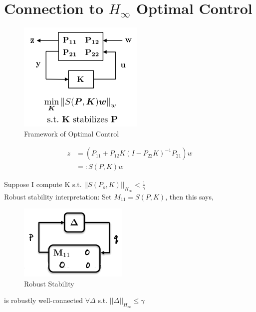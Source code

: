 \documentclass{article}[12pt]
\newcommand{\norm}[1]{\left|\left|#1\right|\right|}
\begin{document}
\section{Connection to $H_{\infty}$ Optimal Control}
\begin{figure} [H]
    \centering
    \includegraphics[scale =.7]{figures/optcontrol.png}
    \caption{Framework of Optimal Control}
    \label{fig:optcontrol}
\end{figure}
\begin{align*}
    z &= (P_{11} + P_{12}K( I - P_{22}K)^{-1}P_{21})w\\
    &=: S(P,K)w
\end{align*}

Suppose I compute K s.t. $\norm{S(P_o, K)}_{H_{\infty}} < \frac{1}{\gamma}$\\
Robust stability interpretation: Set $M_{11} = S(P, K)$, then this says,
\begin{figure}[H]
    \centering
    \includegraphics[scale =.7]{figures/robuststability.png}
    \caption{Robust Stability}
    \label{fig:robuststability}
\end{figure}
is robustly well-connected $\forall \Delta$ s.t. $\norm{\Delta}_{H_{\infty}} \leq \gamma$
\end{document}
